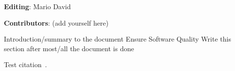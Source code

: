 \textbf{Editing}: Mario David

\textbf{Contributors}: (add yourself here)

Introduction/summary to the document Ensure Software Quality
Write this section after most/all the document is done

Test citation~\cite{orviz_fernandez_eosc-synergy_2020}.
